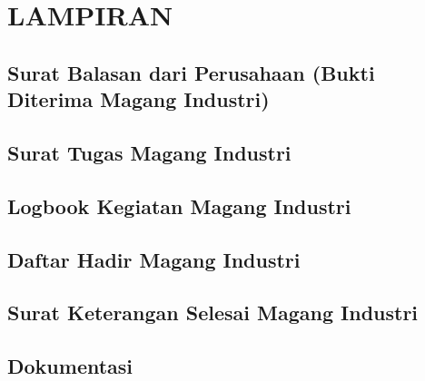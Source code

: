 \appendix
\chapter*{LAMPIRAN}
\setcounter{section}{0} %
\setcounter{page}{1}

\renewcommand{\thesection}{\Alph{section}}
\renewcommand{\thesubsection}{\Alph{section}.\arabic{subsection}\hspace{-0.25cm}}
\renewcommand{\thepage}{L - \arabic{page}}

\section{Surat Balasan dari Perusahaan (Bukti Diterima Magang Industri)}

\newpage
\section{Surat Tugas Magang Industri}

\newpage
\section{Logbook Kegiatan Magang Industri}

\newpage
\section{Daftar Hadir Magang Industri}

\newpage
\section{Surat Keterangan Selesai Magang Industri}

\newpage
\section{Dokumentasi}
